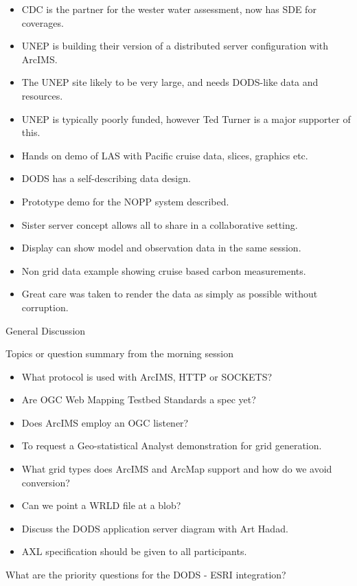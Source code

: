 \begin{itemize}
\item CDC is the partner for the wester water assessment, now has SDE for coverages.
\item UNEP is building their version of a distributed server configuration with ArcIMS.
\item The UNEP site likely to be very large, and needs DODS-like data and resources.
\item UNEP is typically poorly funded, however Ted Turner is a major supporter of this.
\item Hands on demo of LAS with Pacific cruise data, slices, graphics etc.
\item DODS has a self-describing data design.
\item Prototype demo for the NOPP system described.
\item Sister server concept allows all to share in a collaborative setting.
\item Display can show model and observation data in the same session.
\item Non grid data example showing cruise based carbon measurements.
\item Great care was taken to render the data as simply as possible without corruption.
\end{itemize}


General Discussion
        
        Topics or question summary from the morning session

\begin{itemize}
\item What protocol is used with ArcIMS, HTTP or SOCKETS?
\item Are OGC Web Mapping Testbed Standards a spec yet?
\item Does ArcIMS employ an OGC listener?
\item To request a Geo-statistical Analyst demonstration for grid generation.
\item What grid types does ArcIMS and ArcMap support and how do we avoid conversion?
\item Can we point a WRLD file at a blob?
\item Discuss the DODS application server diagram with Art Hadad.
\item AXL specification should be given to all participants.
\end{itemize}

        What are the priority questions for the DODS - ESRI integration?
        
